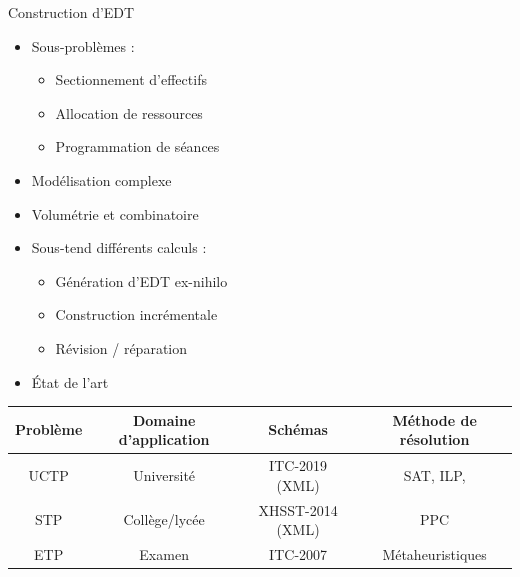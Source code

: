 \documentclass{beamer}
\begin{document}
\begin{frame}{Construction d'EDT}
    \begin{minipage}{0.49\textwidth}
    \begin{itemize}
        \item Sous-problèmes :
        \begin{itemize}
            \item Sectionnement d'effectifs
            \item Allocation de ressources
            \item Programmation de séances
        \end{itemize}
        \item Modélisation complexe
    \end{itemize}
\end{minipage}
    \begin{minipage}{0.49\textwidth}
    \begin{itemize}
        \item Volumétrie et combinatoire
        \item Sous-tend différents calculs :
        \begin{itemize}
            \item Génération d'EDT ex-nihilo
            \item Construction incrémentale
            \item Révision / réparation
        \end{itemize}
    \end{itemize}
\end{minipage}
\vspace{1cm}
    \begin{itemize}
   \item État de l'art 
   \vspace{-0.5cm}
\end{itemize}
   \begin{table}[!ht]
        \scriptsize
        \begin{tabular}{|c|c|c|c|}
             \hline
             Problème & Domaine d'application & Schémas &  Méthode de résolution \\
            \hline
            \hline
             UCTP & Université & ITC-2019 \cite{2018_muller_PATAT} (XML) & SAT\cite{2021_lemos_TR}, ILP\cite{2014_aizam_NACO,2016_ober_PATAT},   \\
              \cline{1-3}
             STP & Collège/lycée & XHSST-2014 \cite{2012_ahmadi_AOR} (XML) & PPC\cite{1998_goltz_INAP,2006_gavalleni,2007_abdennadher_SBH}  \\
             \cline{1-3}
             ETP & Examen & ITC-2007 & Métaheuristiques        \cite{2010_hao_EJOR,2010_mushi_AJST,2019_jawa_JIM} \\
             \hline
        \end{tabular}
        

\end{table}
\end{frame}
\end{document}
